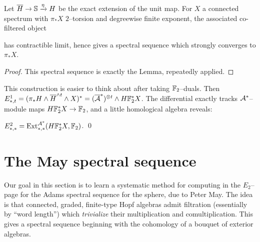 \begin{theorem}
Let $\overline H \to \S \xrightarrow \eta H$ be the exact extension of the unit map.
For $X$ a connected spectrum with $\pi_* X$ $2$--torsion and degreewise finite exponent, the associated co-filtered object
\begin{center}
\end{center}
has contractible limit, hence gives a spectral sequence which strongly converges to $\pi_* X$.
\end{theorem}
\begin{proof}
This spectral sequence is exactly the Lemma, repeatedly applied.
\end{proof}

This construction is easier to think about after taking $\F_2$--duals.  Then $E^1_{*, t} = (\pi_* H \sm \overline H^{\sm t} \sm X)^* = (\overline{\A}^*)^{\otimes t} \sm H\F_2^* X$.  The differential exactly tracks $\A^*$--module maps $H\F_2^* X \to \F_2$, and a little homological algebra reveals:
\begin{lemma}
$E^2_{*, *} = \Ext^{\A^*}_{*, *}(H\F_2^* X, \F_2)$. \qed
\end{lemma}

\begin{remark}
\end{remark}





\section{The May spectral sequence}

Our goal in this section is to learn a systematic method for computing in the $E_2$--page for the Adams spectral sequence for the sphere, due to Peter May.
The idea is that connected, graded, finite-type Hopf algebras admit filtration (essentially by ``word length'') which \emph{trivialize} their multiplication and comultiplication.
This gives a spectral sequence beginning with the cohomology of a bouquet of exterior algebras.

